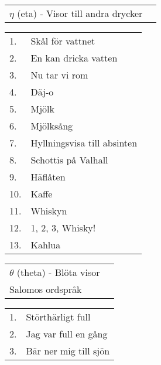 \documentclass[a6paper,10pt]{article}
\begin{document}
\begin{table}[!h]
\begin{tabularx}{1\textwidth}{l X}
\Large $\eta$ (eta) - Visor till andra drycker&
\end{tabularx}
\end{table}
\begin{table}[!h]
\begin{tabularx}{1\textwidth}{l X}
1.&Skål för vattnet\\
2.&En kan dricka vatten\\
3.&Nu tar vi rom\\
4.&Däj-o\\
5.&Mjölk\\
6.&Mjölksång\\
7.&Hyllningsvisa till absinten\\
8.&Schottis på Valhall\\
9.&Häflåten\\
10.&Kaffe\\
11.&Whiskyn\\
12.&1, 2, 3, Whisky!\\
13.&Kahlua
\end{tabularx}
\end{table}
\begin{table}[!h]
\begin{tabularx}{1\textwidth}{l X}
\Large $\theta$ (theta) - Blöta visor&\\
\normalsize Salomos ordspråk&
\end{tabularx}
\end{table}
\begin{table}[!h]
\begin{tabularx}{1\textwidth}{l X}
1.&Störthärligt full\\
2.&Jag var full en gång\\
3.&Bär ner mig till sjön
\end{tabularx}
\end{table}
\end{document}

